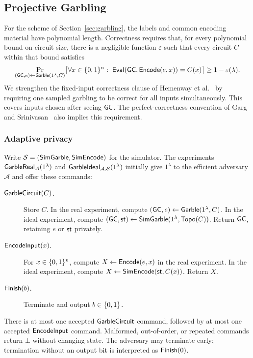 \subsection{Projective Garbling}
\label{app:garbling}

For the scheme of Section~\ref{sec:garbling}, the labels and common
encoding material have polynomial length.
Correctness requires that, for every polynomial bound on circuit size,
there is a negligible function $\varepsilon$ such that every circuit $C$
within that bound satisfies
\begin{equation}
\label{eq:garbling-correctness}
  \Pr_{(\mathsf{GC},e)\mathrel{\leftarrow}\mathsf{Garble}(1^\lambda,C)}
  \bigl[\forall x\in\{0,1\}^n:\;
    \mathsf{Eval}(\mathsf{GC},\mathsf{Encode}(e,x))=C(x)\bigr]
    \ge 1-\varepsilon(\lambda).
\end{equation}
We strengthen the fixed-input correctness clause of Hemenway et al.\
\cite[full version, Definition~1]{HemenwayEtAl2016AdaptiveGarbling}
by requiring one sampled garbling to be correct for all inputs
simultaneously.  This covers inputs chosen after seeing $\mathsf{GC}$.
The perfect-correctness convention of Garg and Srinivasan~
\cite[full version, Definition~3.7]{GargSrinivasan2018AdaptiveGarbling}
also implies this requirement.

\subsubsection{Adaptive privacy}
Write $\mathcal S=(\mathsf{SimGarble},\mathsf{SimEncode})$ for the simulator.
The experiments $\mathsf{GarbleReal}_{\mathcal A}(1^\lambda)$ and
$\mathsf{GarbleIdeal}_{\mathcal A,\mathcal S}(1^\lambda)$ initially give
$1^\lambda$ to the efficient adversary $\mathcal A$ and offer these
commands:
\begin{description}
  \item[$\mathsf{GarbleCircuit}(C)$.]
    Store $C$.  In the real experiment, compute
    $(\mathsf{GC},e)\mathrel{\leftarrow}\mathsf{Garble}(1^\lambda,C)$.
    In the ideal experiment, compute
    $(\mathsf{GC},\mathsf{st})\mathrel{\leftarrow}
    \mathsf{SimGarble}(1^\lambda,\mathsf{Topo}(C))$.
    Return $\mathsf{GC}$, retaining $e$ or $\mathsf{st}$ privately.
  \item[$\mathsf{EncodeInput}(x)$.]
    For $x\in\{0,1\}^n$, compute $X\gets\mathsf{Encode}(e,x)$ in the
    real experiment.  In the ideal experiment, compute
    $X\mathrel{\leftarrow}\mathsf{SimEncode}(\mathsf{st},C(x))$.  Return $X$.
  \item[$\mathsf{Finish}(b)$.]
    Terminate and output $b\in\{0,1\}$.
\end{description}
There is at most one accepted $\mathsf{GarbleCircuit}$ command, followed
by at most one accepted $\mathsf{EncodeInput}$ command.  Malformed,
out-of-order, or repeated commands return $\bot$ without changing state.
The adversary may terminate early; termination without an output bit is
interpreted as $\mathsf{Finish}(0)$.

